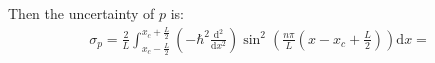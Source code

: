 \documentclass[]{ctexart}
\newcommand{\di}{\mathrm{d}}
\begin{document}
\begin{enumerate}
				Then the uncertainty of $p$ is:
					\begin{equation*}
						\begin{aligned}
							\sigma_p=\frac{2}{L}\int_{x_c-\frac{L}{2}}^{x_c+\frac{L}{2}}(-\hbar^2\frac{\di^2}{\di x^2})\sin^2\left( \frac{n\pi}{L}\left( x-x_c+\frac{L}{2}\right)\right)\di x=
						\end{aligned}
					\end{equation*}
			\end{enumerate}
		
			
		
			
			
	
		
			
		
	
	
	
	
	
	
	
	
	
		
\end{document}
